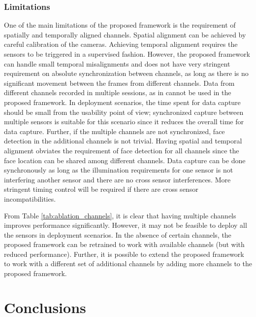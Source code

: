 \documentclass[journal]{IEEEtran}
\begin{document}
\subsubsection{Limitations}

One of the main limitations of the proposed framework is the requirement of spatially and temporally aligned channels. Spatial alignment can be achieved by careful calibration of the cameras. Achieving temporal alignment requires the sensors to be triggered in a supervised fashion. However, the proposed framework can handle small temporal misalignments and does not have very stringent requirement on absolute synchronization between channels, as long as there is no significant movement between the frames from different channels. Data from different channels recorded in multiple sessions, as in \cite{agarwal2017face} cannot be used in the proposed framework. In deployment scenarios, the time spent for data capture should be small from the usability point of view; synchronized capture between multiple sensors is suitable for this scenario since it reduces the overall time for data capture. Further, if the multiple channels are not synchronized, face detection in the additional channels is not trivial. Having spatial and temporal alignment obviates the requirement of face detection for all channels since the face location can be shared among different channels. Data capture can be done synchronously as long as the illumination requirements for one sensor is not interfering another sensor and there are no cross sensor interferences. More stringent timing control will be required if there are cross sensor incompatibilities.

From Table \ref{tab:ablation_channels}, it is clear that having multiple channels improves performance significantly. However, it may not be feasible to deploy all the sensors in deployment scenarios. In the absence of certain channels, the proposed framework can be retrained to work with available channels (but with reduced performance). Further, it is possible to extend the proposed framework to work with a different set of additional channels by adding more channels to the proposed framework.

\section{Conclusions}
\end{document}
